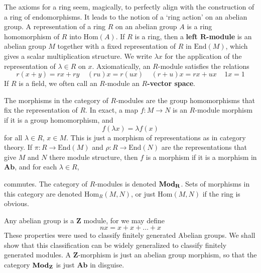 The axioms for a ring seem, magically, to perfectly align with the construction of a  ring of endomorphisms. It leads to the notion of a `ring action' on an abelian group. A representation of a ring $R$ on an abelian group $A$ is a ring homomorphism of $R$ into $\text{Hom}(A)$. If $R$ is a ring, then a {\bf left $\mathbf{R}$-module} is an abelian group $M$ together with a fixed representation of $R$ in $\text{End}(M)$, which gives a scalar multiplication structure. We write $\lambda x$ for the application of the representation of $\lambda \in R$ on $x$. Axiomatically, an $R$-module satisfies the relations
%
\[r(x + y) = rx + ry\ \ \ \ \ (ru) x = r(ux)\ \ \ \ \ (r + u)x = rx + ux\ \ \ \ \ 1x = 1 \]
%
If $R$ is a field, we often call an $R$-module an {\bf $R$-vector space}.

The morphisms in the category of $R$-modules are the group homomorphisms that fix the representation of $R$. In exact, a map $f: M \to N$ is an $R$-module morphism if it is a group homomorphism, and
%
\[ f(\lambda x) = \lambda f(x) \]
%
for all $\lambda \in R$, $x \in M$. This is just a morphism of representations as in category theory. If $\pi: R \to \text{End}(M)$ and $\rho: R \to \text{End}(N)$ are the representations that give $M$ and $N$ there module structure, then $f$ is a morphism if it is a morphism in $\mathbf{Ab}$, and for each $\lambda \in R$,
%
\begin{center}
\end{center}
%
commutes. The category of $R$-modules is denoted $\text{{\bf Mod}}_\mathbf{R}$. Sets of morphisms in this category are denoted $\text{Hom}_R(M,N)$, or just $\text{Hom}(M,N)$ if the ring is obvious.

\begin{example}
    Any abelian group is a $\mathbf{Z}$ module, for we may define
    \[ nx = x + x + \dots + x \]
    These properties were used to classify finitely generated Abelian groups. We shall show that this classification can be widely generalized to classify finitely generated modules. A $\mathbf{Z}$-morphism is just an abelian group morphism, so that the category $\text{{\bf Mod}}_\mathbf{Z}$ is just $\mathbf{Ab}$ in disguise.
\end{example}

